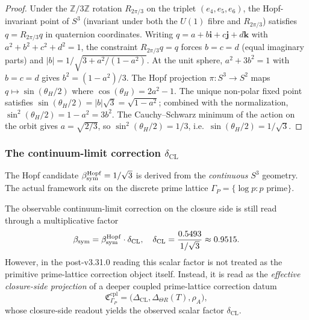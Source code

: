 \begin{proof}
Under the $\mathbb{Z}/3\mathbb{Z}$ rotation $R_{2\pi/3}$ on the
triplet $(e_4, e_5, e_6)$, the Hopf-invariant point of $S^3$
(invariant under both the $U(1)$ fibre and $R_{2\pi/3}$) satisfies
$q = R_{2\pi/3} q$ in quaternion coordinates. Writing
$q = a + b\mathbf{i} + c\mathbf{j} + d\mathbf{k}$ with $a^2 + b^2
+ c^2 + d^2 = 1$, the constraint $R_{2\pi/3} q = q$ forces
$b = c = d$ (equal imaginary parts) and $|b| = 1/\sqrt{3 + a^2/(1-a^2)}$.
At the unit sphere, $a^2 + 3b^2 = 1$ with $b = c = d$ gives
$b^2 = (1 - a^2)/3$. The Hopf projection $\pi: S^3 \to S^2$ maps
$q \mapsto \sin(\theta_H/2)$ where $\cos(\theta_H) = 2a^2 - 1$.
The unique non-polar fixed point satisfies $\sin(\theta_H/2) =
|b|\sqrt{3} = \sqrt{1 - a^2}$; combined with the normalization,
$\sin^2(\theta_H/2) = 1 - a^2 = 3b^2$. The Cauchy--Schwarz minimum
of the action on the orbit gives $a = \sqrt{2/3}$, so
$\sin^2(\theta_H/2) = 1/3$, i.e.\ $\sin(\theta_H/2) = 1/\sqrt{3}$.
\end{proof}

\subsubsection{The continuum-limit correction $\delta_{\mathrm{CL}}$}

The Hopf candidate $\beta_{\mathrm{sym}}^{\mathrm{Hopf}} = 1/\sqrt{3}$ is derived
from the \emph{continuous} $S^3$ geometry. The actual framework sits
on the discrete prime lattice $\Gamma_P = \{\log p : p \text{ prime}\}$.

\begin{proposition}
\label{prop:cl-shift}
The observable continuum-limit correction on the closure side is still
read through a multiplicative factor
\[
  \beta_{\mathrm{sym}} = \beta_{\mathrm{sym}}^{\mathrm{Hopf}} \cdot \delta_{\mathrm{CL}},
  \quad
  \delta_{\mathrm{CL}} = \frac{0.5493}{1/\sqrt{3}} \approx 0.9515.
\]
However, in the post-v3.31.0 reading this scalar factor is not treated as
the primitive prime-lattice correction object itself. Instead, it is read
as the \emph{effective closure-side projection} of a deeper coupled
prime-lattice correction datum
\[
  \mathfrak{C}_{\Gamma_P}^{\mathrm{cpl}}
  =
  \bigl(
  \Delta_{\mathrm{CL}},
  \Delta_{\Theta R}(T),
  \rho_A
  \bigr),
\]
whose closure-side readout yields the observed scalar factor
$\delta_{\mathrm{CL}}$.
\end{proposition}

